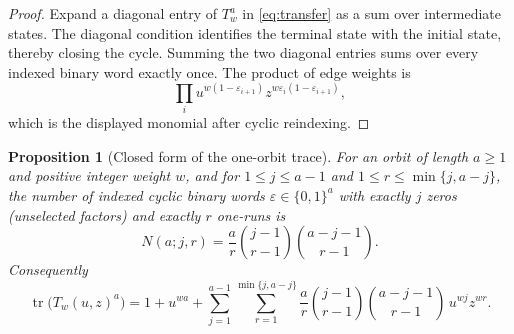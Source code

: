 \documentclass[10pt,a4paper]{article}
\numberwithin{equation}{section}
\theoremstyle{plain}
\newtheorem{proposition}[theorem]{Proposition}
\theoremstyle{definition}
\theoremstyle{remark}
\begin{document}
\begin{proof}
Expand a diagonal entry of $T_w^a$ in \eqref{eq:transfer} as a sum over
intermediate states. The diagonal condition identifies the terminal state with
the initial state, thereby closing the cycle. Summing the two diagonal entries
sums over every indexed binary word exactly once. The product of edge weights is
\[
\prod_i u^{w(1-\varepsilon_{i+1})}z^{w\varepsilon_i(1-\varepsilon_{i+1})},
\]
which is the displayed monomial after cyclic reindexing.
\end{proof}

\begin{proposition}[Closed form of the one-orbit trace]\label{prop:closed}
For an orbit of length $a\ge1$ and positive integer weight $w$, and for
$1\le j\le a-1$ and $1\le r\le\min\{j,a-j\}$, the number of indexed cyclic binary
words $\varepsilon\in\{0,1\}^{a}$ with exactly $j$ zeros (unselected factors) and
exactly $r$ one-runs is
\[
N(a;j,r)=\frac{a}{r}\binom{j-1}{r-1}\binom{a-j-1}{r-1}.
\]
Consequently
\[
\operatorname{tr}\bigl(T_w(u,z)^{a}\bigr)
 =1+u^{wa}+\sum_{j=1}^{a-1}\sum_{r=1}^{\min\{j,a-j\}}
 \frac{a}{r}\binom{j-1}{r-1}\binom{a-j-1}{r-1}\,u^{wj}z^{wr}.
\]
\end{proposition}
\end{document}
